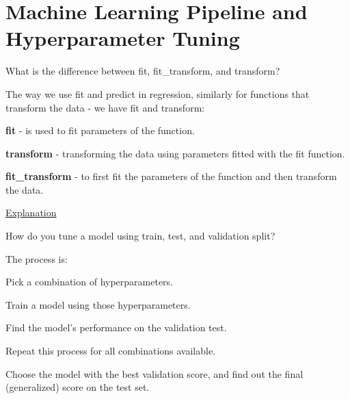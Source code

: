 	\chapter{Machine Learning Pipeline and Hyperparameter Tuning}

	\resetquestioncounter{}
	\begin{qanda}
		\begin{question}
What is the difference between fit, fit\_transform, and transform?
		\end{question}

		\begin{answer}
The way we use fit and predict in regression, similarly for functions that transform the data - we have fit and transform:

\textbf{fit} - is used to fit parameters of the function.

\textbf{transform} - transforming the data using parameters fitted with the fit function.

\textbf{fit\_transform} - to first fit the parameters of the function and then transform the data.

\href{https://towardsdatascience.com/what-and-why-behind-fit-transform-vs-transform-in-scikit-learn-78f915cf96fe}{Explanation}
		\end{answer}
	\end{qanda}

	\begin{qanda}
		\begin{question}
How do you tune a model using train, test, and validation split?
		\end{question}

		\begin{answer}
The process is:
			\begin{numberedlist}
				\item Pick a combination of hyperparameters.%
				\item Train a model using those hyperparameters.%
				\item Find the model's performance on the validation test.%
				\item Repeat this process for all combinations available.%
				\item Choose the model with the best validation score, and find out the final (generalized) score on the test set.%
			\end{numberedlist}%
		\end{answer}%
	\end{qanda}%

